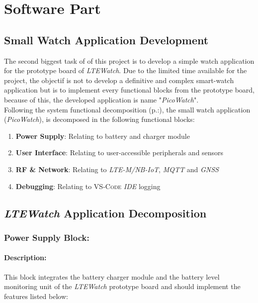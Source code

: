 \documentclass[report.tex]{subfiles}
\begin{document}
\chapter{Software Part}

\section{Small Watch Application Development}

The second biggest task of of this project is to develop a simple watch application for the prototype board of \textit{LTEWatch}. Due to the limited time available for the project, the objectif is not to develop a definitive and complex smart-watch application but is to implement every functional blocks from the prototype board, because of this, the developed application is name "\textit{PicoWatch}".\\

Following the system functional decomposition (p.:\pageref{sec:sys_func_dec}), the small watch application 
(\textit{PicoWatch}), is decomposed in the following functional blocks:

\begin{enumerate}
\item \textbf{Power Supply}: Relating to battery and charger module
\item \textbf{User Interface}: Relating to user-accessible peripherals and sensors
\item \textbf{RF \& Network}: Relating to \textit{LTE-M/NB-IoT}, \textit{MQTT} and \textit{GNSS}
\item \textbf{Debugging}: Relating to \textsc{VS-Code} \textit{IDE} logging
\end{enumerate}

\section{\textit{LTEWatch} Application Decomposition} \label{sec:ltewatch_app_decomp}

\subsection{Power Supply Block:}
\subsubsection{Description:}
This block integrates the battery charger module and the battery level monitoring unit of the \textit{LTEWatch} prototype board and should implement the features listed below:
\end{document}
